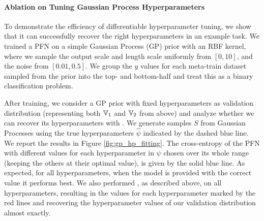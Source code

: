 \documentclass{article}
\newcommand{\sam}[1]{\todo[inline,color=green]{Sam: #1}}
\newcommand{\noah}[1]{\todo[inline,color=orange]{Noah: #1}}
\begin{document}
\paragraph{Ablation on Tuning Gaussian Process Hyperparameters}
To demonstrate the efficiency of differentiable hyperparameter tuning, we show that it can successfully recover the right hyperparameters in an example task.
We trained a PFN on a simple Gaussian Process (GP) prior with an RBF kernel, where we sample the output scale and length scale uniformly from $[0,10]$, and the noise from $[0.01,0.5]$.
We group the $y$ values for each meta-train dataset sampled from the prior
into the top- and bottom-half and treat this as a binary classification problem.

After training, we consider a GP prior with fixed hyperparameters as validation distribution (representing both $\mathbb{V}_1$ and $\mathbb{V}_2$ from above) and analyze whether we can recover its hyperparameters with \priortuning{}. We generate samples $S$ from Gaussian Processes using the true hyperparameters $\hat{\psi}$ indicated by the dashed blue line. We report the results in Figure \ref{fig:gp_hp_fitting}.
The cross-entropy of the PFN with different values for each hyperparameter in $\psi$ chosen over its whole range (keeping the others at their optimal value), is given by the solid blue line.
As expected, for all hyperparameters, when the model is provided with the correct value it performs best.
We also performed \priortuning{}, as described above, on all hyperparameters, resulting in the values for each hyperparameter marked by the red lines and recovering the hyperparameter values of our validation distribution almost exactly.

\end{document}
